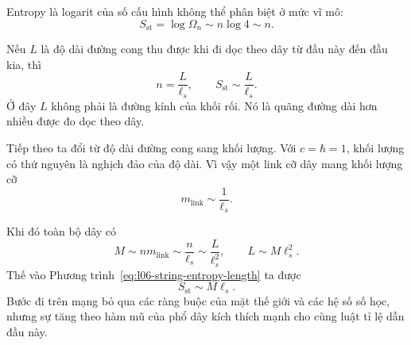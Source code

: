 Entropy là logarit của số cấu hình không thể phân biệt ở mức vĩ mô:
\begin{equation}
S_{\mathrm{st}}=\log\Omega_n\sim n\log4\sim n.
\label{eq:l06-string-entropy-n}
\end{equation}

\begin{classroomqa}
\end{classroomqa}

Nếu \(L\) là độ dài đường cong thu được khi đi dọc theo dây từ đầu này đến đầu kia, thì
\begin{equation}
n=\frac{L}{\ell_s},
\qquad
S_{\mathrm{st}}\sim\frac{L}{\ell_s}.
\label{eq:l06-string-entropy-length}
\end{equation}
Ở đây \(L\) không phải là đường kính của khối rối. Nó là quãng đường dài hơn nhiều được đo dọc theo dây.

Tiếp theo ta đổi từ độ dài đường cong sang khối lượng. Với \(c=\hbar=1\), khối lượng có thứ nguyên là nghịch đảo của độ dài. Vì vậy một link cỡ dây mang khối lượng cỡ
\begin{equation}
m_{\mathrm{link}}\sim\frac{1}{\ell_s}.
\label{eq:l06-link-mass}
\end{equation}

\begin{classroomqa}
\end{classroomqa}

Khi đó toàn bộ dây có
\begin{equation}
M\sim n m_{\mathrm{link}}
\sim\frac{n}{\ell_s}
\sim\frac{L}{\ell_s^2},
\qquad
L\sim M\ell_s^2.
\label{eq:l06-string-mass}
\end{equation}
Thế vào Phương trình~\eqref{eq:l06-string-entropy-length} ta được
\begin{equation}
S_{\mathrm{st}}\sim M\ell_s.
\label{eq:l06-string-entropy-mass}
\end{equation}
Bước đi trên mạng bỏ qua các ràng buộc của mặt thế giới và các hệ số số học, nhưng sự tăng theo hàm mũ của phổ dây kích thích mạnh cho cùng luật tỉ lệ dẫn đầu này.

